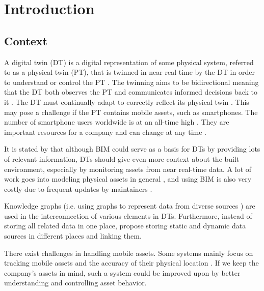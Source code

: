 \documentclass{article}
\begin{document}
\tableofcontents
\newpage

\listoffigures
\newpage

\setcounter{page}{1}

\section{Introduction}\label{sec:Introduction}
\subsection{Context}
A digital twin (DT) is a digital representation of some physical system, referred to as a physical twin (PT), that is twinned in near real-time by the DT in order to understand or control the PT \cite{grieves_digital_2017, kamburjan_digital_2022}. The twinning aims to be bidirectional meaning that the DT both observes the PT and communicates informed decisions back to it \cite{kamburjan_digital_2022, fuller_digital_2020}. The DT must continually adapt to correctly reflect its physical twin \cite{kamburjan_twinning-by-construction_2022}. This may pose a challenge if the PT contains mobile assets, such as smartphones. The number of smartphone users worldwide is at an all-time high \cite{petroc_taylor_number_2023}. They are important resources for a company and can change at any time \cite{marcheta_development_2022}. 

It is stated by \citeauthor{godager_concept_2021} that although BIM could serve as a basis for DTs by providing lots of relevant information, DTs should give even more context about the built environment, especially by monitoring assets from near real-time data. A lot of work goes into modeling physical assets in general \cite{waszak_let_2022}, and using BIM is also very costly due to frequent updates by maintainers \cite{hamledari_ifc-based_2018}.

 Knowledge graphs (i.e. using graphs to represent data from diverse sources \cite{hogan_introduction_2022, ryen_building_2022}) are used in the interconnection of various elements in DTs. Furthermore, instead of storing all related data in one place, \citeauthor{waszak_let_2022} propose storing static and dynamic data sources in different places and linking them.

There exist challenges in handling mobile assets. Some systems mainly focus on tracking mobile assets and the accuracy of their physical location \cite{marcheta_development_2022,akram_design_2021}. If we keep the company's assets in mind, such a system could be improved upon by better understanding and controlling asset behavior. 
\end{document}
